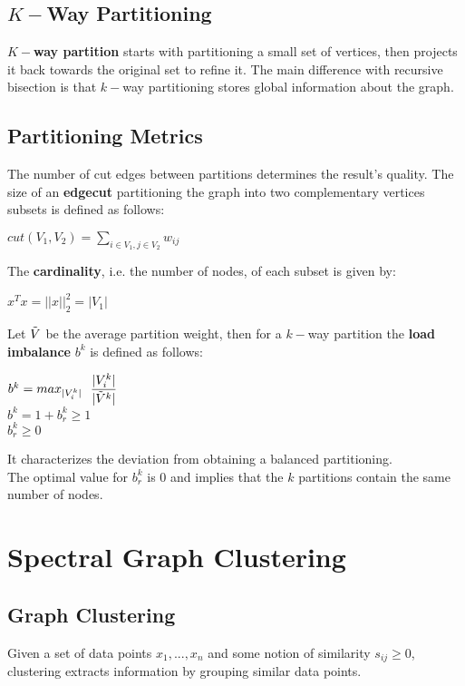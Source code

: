 \documentclass{article}
\begin{document}
\subsection{$K-$Way Partitioning}
\textbf{$K-$way partition} starts with partitioning a small set of vertices, then projects it back towards the original set to refine it. The main difference with recursive bisection is that $k-$way partitioning stores global information about the graph.
\subsection{Partitioning Metrics}
The number of cut edges between partitions determines the result's quality. The size of an \textbf{edgecut} partitioning the graph into two complementary vertices subsets is defined as follows:
\begin{center}
    $cut(V_1,V_2) = \displaystyle\sum_{i \in V_1, j \in V_2} w_{ij}$
\end{center}
The \textbf{cardinality}, i.e. the number of nodes, of each subset is given by:
\begin{center}
    $x^Tx = ||x||_2^2 = |V_1|$
\end{center}
Let $\Tilde{V}$ be the average partition weight, then for a $k-$way partition the \textbf{load imbalance} $b^k$ is defined as follows:
\begin{center}
    $b^k = max_{|V_i^k|} \ \ \displaystyle\frac{|V_i^k|}{|\Tilde{V}^k|}$ \\
    \vspace{0.3cm}
    $b^k = 1 + b^k_r \geq 1$ \\
    \vspace{0.35cm}
    $b^k_r \geq 0 $
\end{center}
It characterizes the deviation from obtaining a balanced partitioning. \\
The optimal value for $b^k_r$ is $0$ and implies that the $k$ partitions contain the same number of nodes.

\newpage

\section{Spectral Graph Clustering}
\subsection{Graph Clustering}
Given a set of data points $x_1,...,x_n$ and some notion of similarity $s_{ij} \geq 0$, clustering extracts information by grouping similar data points.
\end{document}
